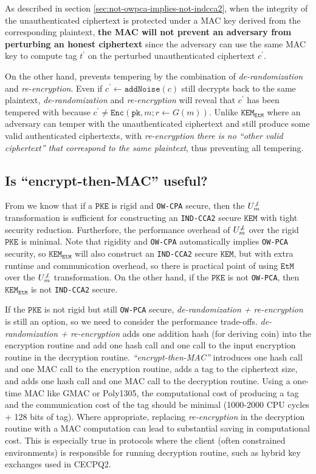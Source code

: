 \documentclass[floatrow,journal=tches,submission]{iacrtrans}
\newcommand{\pke}{\texttt{PKE}}
\newcommand{\encrypt}{\texttt{Enc}}
\newcommand{\kem}{\texttt{KEM}}
\newcommand{\etm}{\texttt{EtM}}  %
\newcommand{\pk}{\texttt{pk}}
\begin{document}
As described in section \ref{sec:not-owpca-implies-not-indcca2}, when the integrity of the unauthenticated ciphertext is protected under a MAC key derived from the corresponding plaintext, \textbf{the MAC will not prevent an adversary from perturbing an honest ciphertext} since the adversary can use the same MAC key to compute tag $t^\prime$ on the perturbed unauthenticated ciphertext $c^\prime$.

On the other hand, \cite{hofheinz2017modular} prevents tempering by the combination of \emph{de-randomization} and \emph{re-encryption}. Even if $c^\prime \leftarrow \texttt{addNoise}(c)$ still decrypts back to the same plaintext, \emph{de-randomization} and \emph{re-encryption} will reveal that $c^\prime$ has been tempered with because $c^\prime \neq \encrypt(\pk, m; r\leftarrow G(m))$. Unlike $\kem_\etm$ where an adversary can temper with the unauthenticated ciphertext and still produce some valid authenticated ciphertexts, with \emph{re-encryption} \emph{there is no ``other valid ciphertext'' that correspond to the same plaintext}, thus preventing all tempering.

\subsection{Is ``encrypt-then-MAC'' useful?}
From \cite{hofheinz2017modular} we know that if a $\pke$ is rigid and \texttt{OW-CPA} secure, then the $U^{\not\bot}_m$ transformation is sufficient for constructing an \texttt{IND-CCA2} secure $\kem$ with tight security reduction. Furtherfore, the performance overhead of $U^{\not\bot}_m$ over the rigid $\pke$ is minimal. Note that rigidity and \texttt{OW-CPA} automatically implies \texttt{OW-PCA} security, so $\kem_\etm$ will also construct an \texttt{IND-CCA2} secure $\kem$, but with extra runtime and communication overhead, so there is practical point of using $\etm$ over the $U^{\not\bot}_m$ transformation. On the other hand, if the $\pke$ is not \texttt{OW-PCA}, then $\kem_\etm$ is not \texttt{IND-CCA2} secure.

If the $\pke$ is not rigid but still \texttt{OW-PCA} secure, \emph{de-randomization + re-encryption} is still an option, so we need to consider the performance trade-offs. \emph{de-randomization + re-encryption} adds one addition hash (for deriving coin) into the encryption routine and add one hash call and one call to the input encryption routine in the decryption routine. \emph{``encrypt-then-MAC''} introduces one hash call and one MAC call to the encryption routine, adds a tag to the ciphertext size, and adds one hash call and one MAC call to the decryption routine. Using a one-time MAC like GMAC or Poly1305, the computational cost of producing a tag and the communication cost of the tag should be minimal (1000-2000 CPU cycles + 128 bits of tag). Where appropriate, replacing \emph{re-encryption} in the decryption routine with a MAC computation can lead to substantial saving in computational cost. This is especially true in protocols where the client (often constrained environments) is responsible for running decryption routine, such as hybrid key exchanges used in CECPQ2.
\end{document}
